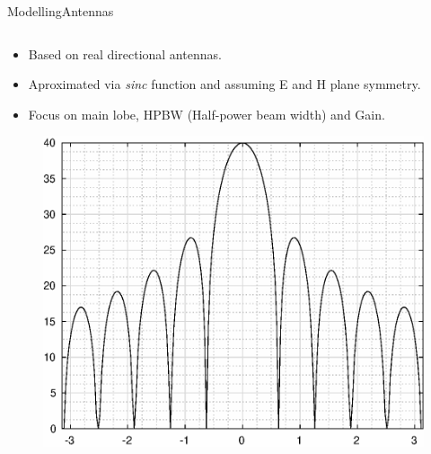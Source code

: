 
\begin{frame}{Modelling}{Antennas}
  \begin{columns}[T]
    \begin{column}{.5\textwidth}
      \begin{block}{}
        \begin{itemize}
          \item {Based on real directional antennas.}
          \item {Aproximated via \textit{sinc} function and assuming E and H plane symmetry.}
          \item {Focus on main lobe, HPBW (Half-power beam width) and Gain.}
        \end{itemize}
        \begin{figure}
        \includegraphics[scale=0.25]{figures/sinc2.eps}
      \end{figure}


\end{block}
\end{column}
\end{columns}
\end{frame}
